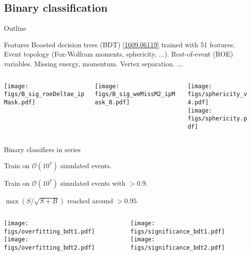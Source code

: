 \subsection{Binary classification}
\begin{frame}[noframenumbering]{Outline}
\end{frame}
\begin{frame}{Features}
\bi
\itemii Boosted decision trees (BDT) \href{https://arxiv.org/abs/1609.06119}{\color{blue!40!gray} [1609.06119]} trained with 51 features.
\bi
\itemiii Event topology (Fox-Wolfram moments, sphericity, ...).
\itemiii Rest-of-event (ROE) variables.
\itemiii Missing energy, momentum.
\itemiii Vertex separation.
\itemiii ...
\ei
\ei
\vspace{0.5cm}
\centering
\begin{columns}
\begin{column}{0.333\linewidth}
\centering
\texttt{[image: figs/B\_sig\_roeDeltae\_ipMask.pdf]}
\end{column}
\begin{column}{0.333\linewidth}
\centering
\texttt{[image: figs/B\_sig\_weMissM2\_ipMask\_0.pdf]}
\end{column}
\begin{column}{0.333\linewidth}
\centering
\vspace{-2.05cm}
\texttt{[image: figs/sphericity\_v4.pdf]}\\
\vspace{0.3cm}
\texttt{[image: figs/sphericity.pdf]}
\end{column}
\end{columns}
\end{frame}
\begin{frame}{Binary classifiers in series}
\bi
\item Train \bdto on $\mathcal{O}(10^7)$ simulated events.
\item Train \bdtt on $\mathcal{O}(10^7)$ simulated events with \bdto$>0.9$.
\item {$\max(S/\sqrt{S+B})$ reached around \bdtt$>0.95$.}
\ei
\vspace{0.25cm}
\begin{columns}
\begin{column}{0.5\linewidth}
\centering
\texttt{[image: figs/overfitting\_bdt1.pdf]}
\texttt{[image: figs/overfitting\_bdt2.pdf]}
\end{column}
\begin{column}{0.5\linewidth}
\centering
\texttt{[image: figs/significance\_bdt1.pdf]}
\texttt{[image: figs/significance\_bdt2.pdf]}
\end{column}
\end{columns}
\end{frame}
